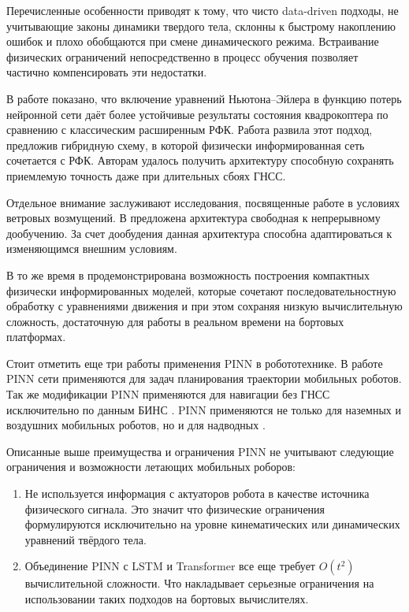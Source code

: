 Перечисленные особенности приводят к тому, что чисто data-driven подходы, не учитывающие законы динамики твердого тела, склонны к быстрому накоплению ошибок и плохо обобщаются при смене динамического режима. Встраивание физических ограничений непосредственно в процесс обучения позволяет частично компенсировать эти недостатки.

В работе \cite{Bianchi2024} показано, что включение уравнений Ньютона--Эйлера в функцию потерь нейронной сети даёт более устойчивые результаты состояния квадрокоптера по сравнению с классическим расширенным РФК. Работа \cite{Tan2023} развила этот подход, предложив гибридную схему, в которой физически информированная сеть сочетается с РФК. Авторам удалось получить архитектуру способную сохранять приемлемую точность даже при длительных сбоях ГНСС.

Отдельное внимание заслуживают исследования, посвященные работе в условиях ветровых возмущений. В \cite{Liu2025} предложена архитектура свободная к непрерывному дообучению. За счет дообудения данная архитектура способна адаптироваться к изменяющимся внешним условиям. 

В то же время в \cite{Bian2025} продемонстрирована возможность построения компактных физически информированных моделей, которые сочетают последовательностную обработку с уравнениями движения и при этом сохраняя низкую вычислительную сложность, достаточную для работы в реальном времени на бортовых платформах.


Стоит отметить еще три работы применения PINN в робототехнике. В работе \cite{ZhangPINNPathPlanning} PINN сети применяются для задач планирования траектории мобильных роботов. Так же модификации PINN применяются для навигации без ГНСС исключительно по данным БИНС \cite{Sahoo2025}. PINN применяются не только для наземных и воздушних мобильных роботов, но и для надводных \cite{An2025}. 

Описанные выше преимущества и ограничения PINN не учитывают следующие ограничения и возможности летающих мобильных роборов:
 \begin{enumerate}
 	\item Не используется информация с актуаторов робота в качестве источника физического сигнала. Это значит что  физические ограничения формулируются исключительно на уровне кинематических или динамических уравнений твёрдого тела. 
 	\item Объединение PINN с LSTM и Transformer все еще требует \(O(t^2)\) вычислительной сложности. Что накладывает серьезные ограничения на использовании таких подходов на бортовых вычислителях. 
\end{enumerate}


